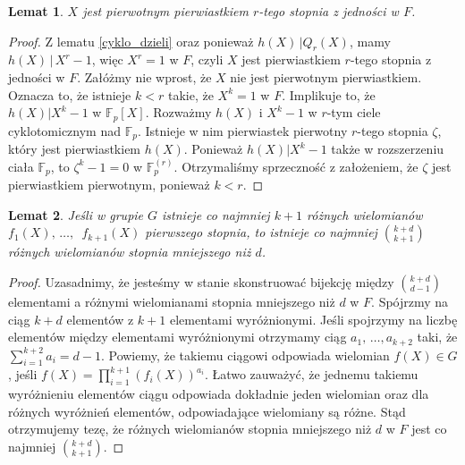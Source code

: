 \documentclass[declaration,shortabstract]{iithesis}
\theoremstyle{definition}
\theoremstyle{remark} \newtheorem{observation}{Obserwacja}
\theoremstyle{plain} \newtheorem{theorem}{Twierdzenie}
\theoremstyle{plain} \newtheorem{lemma}{Lemat}
\theoremstyle{remark} \newtheorem*{remark*}{Uwaga}
\theoremstyle{reminder} \newtheorem*{reminder*}{Przypomnienie}
\begin{document}
\begin{lemma}\label{X_pierw}
	$X$ jest pierwotnym pierwiastkiem $r$-tego stopnia z jedności w $F$.
\end{lemma}
	
\begin{proof}
	Z lematu \ref{cyklo_dzieli} oraz ponieważ $h(X) \, | Q_r(X)$, mamy $h(X) \, | \, X^r - 1$, więc $X^r = 1$ w $F$, czyli $X$ jest pierwiastkiem $r$-tego stopnia z jedności w $F$. Załóżmy nie wprost, że $X$ nie jest pierwotnym pierwiastkiem. Oznacza to, że istnieje $k < r$ takie, że $X^k = 1$ w $F$. Implikuje to, że $h(X) | X^k - 1$ w $\mathbb{F}_p[X]$. Rozważmy $h(X)$ i $X^k - 1$ w $r$-tym ciele cyklotomicznym nad $\mathbb{F}_p$. Istnieje w nim pierwiastek pierwotny $r$-tego stopnia $\zeta$, który jest pierwiastkiem $h(X)$. Ponieważ $h(X) | X^k - 1$ także w rozszerzeniu ciała $\mathbb{F}_p$, to $\zeta^k - 1 = 0$ w $\mathbb{F}_p^{(r)}$. Otrzymaliśmy sprzeczność z założeniem, że $\zeta$ jest pierwiastkiem pierwotnym, ponieważ $k < r$.
					
\end{proof}
	
\begin{lemma}\label{liczba_wielo}
	Jeśli w grupie $G$ istnieje co najmniej $k + 1$ różnych wielomianów $f_1(X), \, \dots,$ $\,f_{k + 1}(X)$ pierwszego stopnia, to istnieje co najmniej ${k + d \choose k + 1}$ różnych wielomianów stopnia mniejszego niż $d$.
\end{lemma}
	
\begin{proof}
	Uzasadnimy, że jesteśmy w stanie skonstruować bijekcję między ${k + d \choose d - 1}$ elementami a różnymi wielomianami stopnia mniejszego niż $d$ w $F$. Spójrzmy na ciąg $k + d$ elementów z $k + 1$ elementami wyróżnionymi. Jeśli spojrzymy na liczbę elementów między elementami wyróżnionymi otrzymamy ciąg $a_1, \, \dots, a_{k + 2}$ taki, że $\sum_{i = 1}^{k + 2}a_i = d - 1$.  Powiemy, że takiemu ciągowi odpowiada wielomian $f(X) \in G$, jeśli $f(X) = \prod_{i = 1}^{k + 1} (f_i(X))^{a_i}$. Łatwo zauważyć, że jednemu takiemu wyróżnieniu elementów ciągu odpowiada dokładnie jeden wielomian oraz dla różnych wyróżnień elementów, odpowiadające wielomiany są różne. Stąd otrzymujemy tezę, że różnych wielomianów stopnia mniejszego niż $d$ w $F$ jest co najmniej ${k + d \choose k + 1}$.
\end{proof}
	
\end{document}
